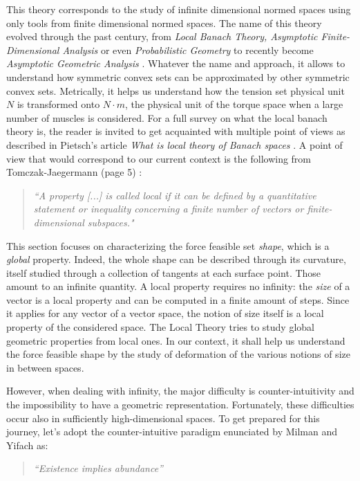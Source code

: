 This theory corresponds to the study of infinite dimensional normed spaces using only tools from finite dimensional normed spaces. The name of this theory evolved through the past century, from \emph{Local Banach Theory, Asymptotic Finite-Dimensional Analysis} or even \emph{Probabilistic Geometry} to recently become \emph{Asymptotic Geometric Analysis} \cite{artstein-avidanAsymptoticGeometricAnalysis2015}. Whatever the name and approach, it allows to understand how symmetric convex sets can be approximated by other symmetric convex sets. Metrically, it helps us understand how the tension set physical unit $N$ is transformed onto $N\cdot m$, the physical unit of the torque space when a large number of muscles is considered.
For a full survey on what the local banach theory is, the reader is invited to get acquainted with multiple point of views as described in Pietsch's article \emph{What is local theory of Banach spaces} \cite{pietschWhatLocalTheory1999}. A point of view that would correspond to our current context is the following from Tomczak-Jaegermann (page 5) \cite{tomczak-jaegermannBanachMazurDistancesFinitedimensional1989}:
\begin{quote}
    \emph{``A property [...] is called \emph{local} if it can be defined by a quantitative statement or inequality concerning a finite number of vectors or finite-dimensional subspaces."}
\end{quote}

This section focuses on characterizing the force feasible set \emph{shape}, which is a \emph{global} property. Indeed, the whole shape can be described through its curvature, itself studied through a collection of tangents at each surface point. Those amount to an infinite quantity. A local property requires no infinity: the \emph{size} of a vector is a local property and can be computed in a finite amount of steps. Since it applies for any vector of a vector space, the notion of size itself is a local property of the considered space. The Local Theory tries to study global geometric properties from local ones. In our context, it shall help us understand the force feasible shape by the study of deformation of the various notions of size in between spaces.

However, when dealing with infinity, the major difficulty is counter-intuitivity and the impossibility to have a geometric representation. Fortunately, these difficulties occur also in sufficiently high-dimensional spaces. To get prepared for this journey, let's adopt the counter-intuitive paradigm enunciated by Milman and Yifach \cite{milmanRegularRandomSections2021} as:
\begin{quotation}
    \centering
    \emph{``Existence implies abundance''}
\end{quotation}

